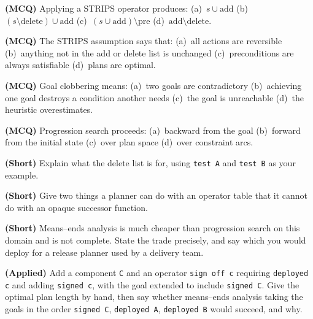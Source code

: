\begin{reviewq}
  \item \textbf{(MCQ)} Applying a STRIPS operator produces:
        (a)~$s \cup \mathrm{add}$ (b)~$(s \setminus \mathrm{delete}) \cup
        \mathrm{add}$ (c)~$(s \cup \mathrm{add}) \setminus \mathrm{pre}$
        (d)~$\mathrm{add} \setminus \mathrm{delete}$.
  \item \textbf{(MCQ)} The STRIPS assumption says that: (a)~all actions are
        reversible (b)~anything not in the add or delete list is unchanged
        (c)~preconditions are always satisfiable (d)~plans are optimal.
  \item \textbf{(MCQ)} Goal clobbering means: (a)~two goals are contradictory
        (b)~achieving one goal destroys a condition another needs (c)~the goal is
        unreachable (d)~the heuristic overestimates.
  \item \textbf{(MCQ)} Progression search proceeds: (a)~backward from the goal
        (b)~forward from the initial state (c)~over plan space
        (d)~over constraint arcs.
  \item \textbf{(Short)} Explain what the delete list is for, using
        \texttt{test A} and \texttt{test B} as your example.
  \item \textbf{(Short)} Give two things a planner can do with an operator table
        that it cannot do with an opaque successor function.
  \item \textbf{(Short)} Means--ends analysis is much cheaper than progression
        search on this domain and is not complete. State the trade precisely, and
        say which you would deploy for a release planner used by a delivery team.
  \item \textbf{(Applied)} Add a component \texttt{C} and an operator
        \texttt{sign off c} requiring \texttt{deployed c} and adding
        \texttt{signed c}, with the goal extended to include \texttt{signed C}.
        Give the optimal plan length by hand, then say whether means--ends analysis
        taking the goals in the order \texttt{signed C}, \texttt{deployed A},
        \texttt{deployed B} would succeed, and why.
\end{reviewq}
